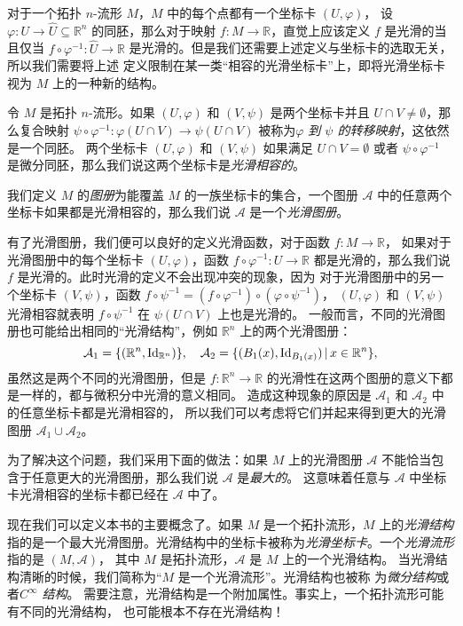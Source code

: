 对于一个拓扑 $n$-流形 $M$，$M$ 中的每个点都有一个坐标卡 $(U,\varphi)$，
设 $\varphi:U\to\hat U\subseteq\mathbb{R}^n$ 的同胚，那么对于映射
$f:M\to\mathbb{R}$，直觉上应该定义 $f$ 是光滑的当且仅当 $f\circ\varphi^{-1}:\hat U\to\mathbb{R}$
是光滑的。但是我们还需要上述定义与坐标卡的选取无关，所以我们需要将上述
定义限制在某一类“相容的光滑坐标卡”上，即将光滑坐标卡视为 $M$ 上的一种新的结构。

令 $M$ 是拓扑 $n$-流形。如果 $(U,\varphi)$ 和 $(V,\psi)$ 是两个坐标卡并且
$U\cap V\neq\emptyset$，那么复合映射 $\psi\circ\varphi^{-1}:\varphi(U\cap V)\to\psi(U\cap V)$
被称为\emph{$\varphi$ 到 $\psi$ 的转移映射}，这依然是一个同胚。
两个坐标卡 $(U,\varphi)$ 和 $(V,\psi)$ 如果满足 $U\cap V=\emptyset$ 或者
$\psi\circ\varphi^{-1}$ 是微分同胚，那么我们说这两个坐标卡是\emph{光滑相容的}。

我们定义 $M$ 的\emph{图册}为能覆盖 $M$ 的一族坐标卡的集合，一个图册 $\mathcal{A}$
中的任意两个坐标卡如果都是光滑相容的，那么我们说 $\mathcal{A}$ 是一个\emph{光滑图册}。

有了光滑图册，我们便可以良好的定义光滑函数，对于函数 $f:M\to\mathbb{R}$，
如果对于光滑图册中的每个坐标卡 $(U,\varphi)$，函数 $f\circ\varphi^{-1}:U\to\mathbb{R}$
都是光滑的，那么我们说 $f$ 是光滑的。此时光滑的定义不会出现冲突的现象，因为
对于光滑图册中的另一个坐标卡 $(V,\psi)$，函数 $f\circ\psi^{-1}=(f\circ\varphi^{-1})\circ(\varphi\circ\psi^{-1})$，
$(U,\varphi)$ 和 $(V,\psi)$ 光滑相容就表明 $f\circ\psi^{-1}$ 在 $\psi(U\cap V)$ 上也是光滑的。
一般而言，不同的光滑图册也可能给出相同的“光滑结构”，例如 $\mathbb{R}^n$ 上的两个光滑图册：
\[
  \mathcal{A}_1=\{(\mathbb{R}^n,\operatorname{Id}_{\mathbb{R}^n})\},\quad
  \mathcal{A}_2=\{(B_1(x),\operatorname{Id}_{B_1(x)})\,|\, x\in\mathbb{R}^n\},
\]
虽然这是两个不同的光滑图册，但是 $f:\mathbb{R}^n\to\mathbb{R}$
的光滑性在这两个图册的意义下都是一样的，都与微积分中光滑的意义相同。
造成这种现象的原因是 $\mathcal{A}_1$ 和 $\mathcal{A}_2$ 中的任意坐标卡都是光滑相容的，
所以我们可以考虑将它们并起来得到更大的光滑图册 $\mathcal{A}_1\cup\mathcal{A}_2$。

为了解决这个问题，我们采用下面的做法：如果 $M$ 上的光滑图册 $\mathcal{A}$
不能恰当包含于任意更大的光滑图册，那么我们说 $\mathcal{A}$ 是\emph{最大的}。
这意味着任意与 $\mathcal{A}$ 中坐标卡光滑相容的坐标卡都已经在 $\mathcal{A}$
中了。

现在我们可以定义本书的主要概念了。如果 $M$ 是一个拓扑流形，$M$ 上的\emph{光滑结构}
指的是一个最大光滑图册。光滑结构中的坐标卡被称为\emph{光滑坐标卡}。一个\emph{光滑流形}指的是 $(M,\mathcal{A})$，
其中 $M$ 是拓扑流形，$\mathcal{A}$ 是 $M$ 上的一个光滑结构。
当光滑结构清晰的时候，我们简称为“$M$ 是一个光滑流形”。光滑结构也被称
为\emph{微分结构}或者\emph{$C^\infty$ 结构}。
需要注意，光滑结构是一个附加属性。事实上，一个拓扑流形可能有不同的光滑结构，
也可能根本不存在光滑结构！

